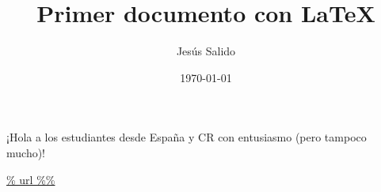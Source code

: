 \documentclass[a4paper]{article}
\title{Primer documento con \LaTeX}
\author{Jesús Salido}
\date{\today}
\begin{document}
\maketitle

¡Hola a los estudiantes desde España y CR con entusiasmo (pero tampoco mucho)!

\url{% url %%}
\end{document}
